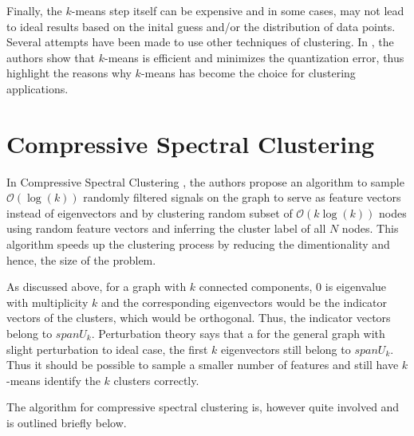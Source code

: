 \documentclass[10pt,a4paper, nocenter]{report}
\begin{document}
    Finally, the $k$-means step itself can be expensive and in some cases, may not lead to ideal results based on the inital guess and/or the distribution of data points. Several attempts have been made to use other techniques of clustering. In \cite{Bottou95convergenceproperties}, the authors show that $k$-means is efficient and minimizes the quantization error, thus highlight the reasons why $k$-means has become the choice for clustering applications. 
    
    \section{Compressive Spectral Clustering}
    In Compressive Spectral Clustering \cite{tremblay-compressive-SC-16}, the authors propose an algorithm to sample $\mathcal{O}(\log(k))$ randomly filtered signals on the graph to serve as feature vectors instead of eigenvectors and by clustering random subset of $\mathcal{O}(k\log(k))$ nodes using random feature vectors and inferring the cluster label of all $N$ nodes. This algorithm speeds up the clustering process by reducing the dimentionality and hence, the size of the problem.

    As discussed above, for a graph with $k$ connected components, 0 is eigenvalue with multiplicity $k$ and the corresponding eigenvectors would be the indicator vectors of the clusters, which would be orthogonal. Thus, the indicator vectors belong to $span{U_k}$. Perturbation theory says that a for the general graph with slight perturbation to ideal case, the first $k$ eigenvectors still belong to $span{U_k}$. Thus it should be possible to sample a smaller number of features and still have $k$-means identify the $k$ clusters correctly. 

    The algorithm for compressive spectral clustering is, however quite involved and is outlined briefly below. 
\end{document}
